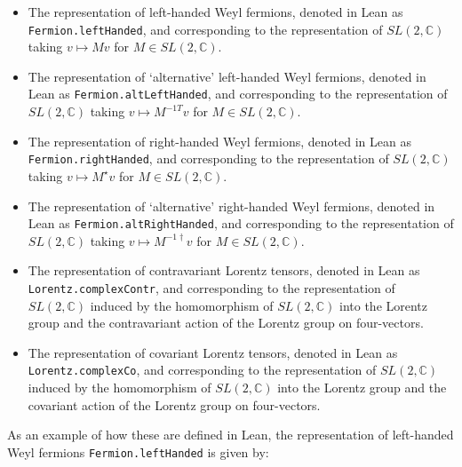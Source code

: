 \documentclass[a4paper, 11pt]{article}
\begin{document}
\begin{itemize}
  \item The representation of left-handed Weyl fermions, 
    denoted in Lean as \lstinline|Fermion.leftHanded|, and corresponding to the 
    representation of $SL(2, \mathbb{C})$ taking $v \mapsto M v$ for $M \in SL(2, \mathbb{C})$.
  \item The representation of `alternative' left-handed Weyl fermions, 
    denoted in Lean as \lstinline|Fermion.altLeftHanded|, and corresponding to the 
    representation of $SL(2, \mathbb{C})$ taking $v \mapsto M^{-1 T} v$ for $M \in SL(2, \mathbb{C})$.
  \item The representation of right-handed Weyl fermions, 
    denoted in Lean as \lstinline|Fermion.rightHanded|, and corresponding to the 
    representation of $SL(2, \mathbb{C})$ taking $v \mapsto M^\star v$ for $M \in SL(2, \mathbb{C})$.
  \item The representation of `alternative' right-handed Weyl fermions,
    denoted in Lean as \lstinline|Fermion.altRightHanded|, and corresponding to the 
    representation of $SL(2, \mathbb{C})$ taking $v \mapsto M^{-1 \dagger} v$ for $M \in SL(2, \mathbb{C})$.
  \item The representation of contravariant Lorentz tensors, 
    denoted in Lean as \lstinline|Lorentz.complexContr|, and corresponding to the 
    representation of $SL(2, \mathbb{C})$ induced by the homomorphism of $SL(2, \mathbb{C})$ into 
    the Lorentz group and the contravariant action of the Lorentz group on four-vectors.
  \item The representation of covariant Lorentz tensors,
     denoted in Lean as \lstinline|Lorentz.complexCo|, and corresponding to the 
    representation of $SL(2, \mathbb{C})$ induced by the homomorphism of $SL(2, \mathbb{C})$ into 
    the Lorentz group and the covariant action of the Lorentz group on four-vectors.
\end{itemize}
As an example of how these are defined in Lean, the representation of left-handed Weyl fermions  \lstinline|Fermion.leftHanded|
is given by:
\end{document}
